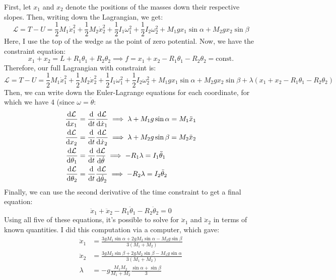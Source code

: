 \documentclass[10pt]{article}
\begin{document}
	\begin{solution}
		First, let $x_1$ and $x_2$ denote the positions of the masses down their respective slopes. Then, writing
		down the Lagrangian, we get:
		\[
		\mathcal L = T - U = \frac{1}{2}M_1\dot x_1^2 + \frac{1}{2}M_2 \dot x_2^2 + \frac{1}{2}I_1 \omega_1^2
		+ \frac{1}{2}I_2\omega_2^2 + M_1gx_1\sin \alpha + M_2gx_2\sin \beta
		\] 
		Here, I use the top of the wedge as the point of zero potential. Now, we have the constraint equation:
		\[
		x_1 + x_2 = L + R_1 \theta_1 + R_2 \theta_2 \implies f = x_1 + x_2 - R_1 \theta_1 - R_2 \theta_2 = \text{
		const.}
		\] 
		Therefore, our full Lagrangian with constraint is:
		\[
		\mathcal L = T - U = \frac{1}{2}M_1\dot x_1^2 + \frac{1}{2}M_2 \dot x_2^2 + \frac{1}{2}I_1 \omega_1^2
		+ \frac{1}{2}I_2\omega_2^2 + M_1gx_1\sin \alpha + M_2gx_2\sin \beta + \lambda(x_1 + x_2 - R_1\theta_1
		- R_2 \theta_2)
		\] 
		Then, we can write down the Euler-Lagrange equations for each coordinate, for which we have 4 (since 
		$\omega = \dot \theta$:
		\begin{align*}
			\dv{\mathcal L}{x_1} &= \dv{t}\dv{\mathcal L}{\dot x_1} \implies \lambda + M_1g \sin \alpha = M_1
			\ddot x_1\\
			\dv{\mathcal L}{x_2} &= \dv{t}\dv{\mathcal L}{\dot x_2} \implies \lambda + M_2g \sin \beta = M_2
			\ddot x_2\\
			\dv{\mathcal L}{\theta_1} &= \dv{t}\dv{\mathcal L}{\dot \theta} \implies -R_1 \lambda = I_1 \ddot 
			\theta_1 \\
			\dv{\mathcal L}{\theta_2} &=  \dv{t} \dv{\mathcal L}{\dot \theta_2} \implies -R_2 \lambda = 
			I_2 \ddot \theta_2 
		\end{align*}
		Finally, we can use the second derivative of the time constraint to get a final equation: 
		\[
		\ddot x_1 + \ddot x_2 - R_1\ddot \theta_1 - R_2 \ddot \theta_2 = 0
		\] 
		Using all five of these equations, it's possible to solve for $\ddot x_1$ and $\ddot x_2$ in terms of 
		known quantities. I did this computation via a computer, which gave:
		\begin{align*}
			\ddot x_1 &= \frac{3gM_1 \sin \alpha + 2gM_2 \sin \alpha - M_2g\sin \beta}{3(M_1 + M_2)} \\
			\ddot x_2 &=  \frac{3gM_2 \sin \beta + 2gM_2 \sin \beta - M_1g \sin \alpha}{3(M_1 + M_2)}  \\
			\lambda &=  -g\frac{M_1M_2}{M_1 + M_2}\frac{\sin \alpha + \sin \beta}{3} 
		\end{align*}
	\end{solution}
\end{document}

